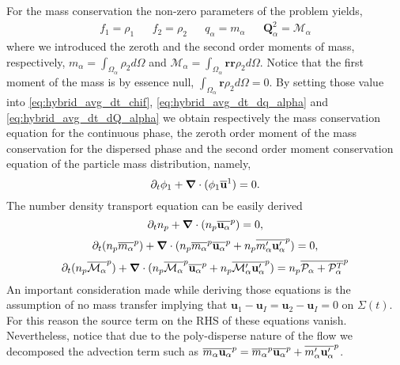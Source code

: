 For the mass conservation the non-zero parameters of the problem yields,
\begin{align*}
    f_1 = \rho_1           
    && f_2 =  \rho_2    
    && q_\alpha 
    = m_\alpha
    && \textbf{Q}^2_\alpha  
    = \mathcal{M}_\alpha
\end{align*} 
where we introduced the zeroth and the second order moments of mass, respectively, $m_\alpha = \int_{\Omega_\alpha} \rho_2 d\Omega$ and 
$\mathcal{M}_\alpha = \int_{\Omega_\alpha} \textbf{rr} \rho_2  d\Omega$. 
Notice that the first moment of the mass is by essence null, $\int_{\Omega_\alpha} \textbf{r} \rho_2 d\Omega = 0$. 
By setting those value into \ref{eq:hybrid_avg_dt_chif}, \ref{eq:hybrid_avg_dt_dq_alpha} and \ref{eq:hybrid_avg_dt_dQ_alpha} we obtain respectively the mass conservation equation for the continuous phase, the  zeroth order moment of the mass conservation for the dispersed phase and the second order moment conservation equation of the particle mass distribution, namely,
\begin{equation}
    \partial_t \phi_1
    + \bm{\nabla} \cdot (\phi_1 \overline{\textbf{u}}^1)
    = 0.
    \label{eq:hybrid_avg_dt_chi_m}
\end{equation}
The number density transport equation can be easily derived 
\begin{equation}
    \partial_t n_p
    + \bm{\nabla} \cdot (n_p\overline{\textbf{u}_\alpha}^{p})
    = 
    0,
    \label{eq:hybrid_avg_dt_n}
\end{equation}
\begin{equation}
    \partial_t (n_p\overline{m_\alpha}^{p})
    + \bm{\nabla} \cdot (n_p\overline{m_\alpha}^{p} \overline{\textbf{u}_\alpha}^{p} + n_p\overline{m_\alpha'\textbf{u}_\alpha'}^{p})
    = 0,
    \label{eq:hybrid_avg_dt_dm_alpha}
\end{equation}
\begin{equation}
    \partial_t (n_p\overline{\mathcal{M}_\alpha}^{p})
    + \bm{\nabla} \cdot (
        n_p\overline{\mathcal{M}_\alpha}^{p} \overline{\textbf{u}_\alpha}^{p}
        + n_p\overline{\mathcal{M}_\alpha' \textbf{u}_\alpha'}^{p}
        )
    = n_p\overline{\mathcal{P}_\alpha+\mathcal{P}_\alpha^T}^{p}
    \label{eq:hybrid_avg_dt_dM_alpha}
\end{equation}
An important consideration made while deriving those equations is the assumption of no mass transfer implying that $\textbf{u}_1 - \textbf{u}_I =\textbf{u}_2 - \textbf{u}_I  =0 $ on $\Sigma(t)$.
For this reason the source term on the RHS of these equations vanish. 
Nevertheless, notice that due to the poly-disperse nature of the flow we decomposed the advection term such as $\overline{m_\alpha \textbf{u}_\alpha}^{p} = \overline{m_\alpha}^{p} \overline{\textbf{u}_\alpha}^{p} + \overline{m'_\alpha \textbf{u}'_\alpha}^{p}$. 
